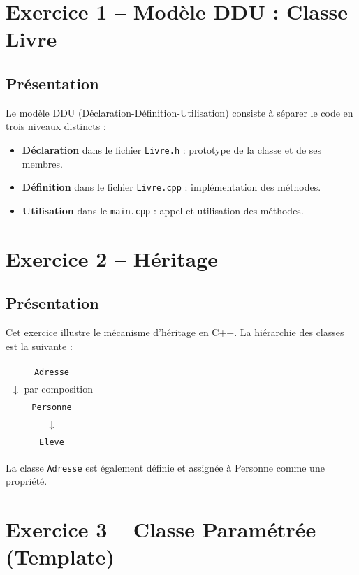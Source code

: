 \documentclass[12pt,a4paper]{article}
\begin{document}
\section{Exercice 1 -- Mod\`ele DDU : Classe Livre}

\subsection{Pr\'esentation}

Le mod\`ele DDU (D\'eclaration-D\'efinition-Utilisation) consiste \`a s\'eparer
le code en trois niveaux distincts :
\begin{itemize}[leftmargin=1.5cm]
    \item \textbf{D\'eclaration} dans le fichier \texttt{Livre.h} : prototype de la classe et de ses membres.
    \item \textbf{D\'efinition} dans le fichier \texttt{Livre.cpp} : impl\'ementation des m\'ethodes.
    \item \textbf{Utilisation} dans le \texttt{main.cpp} : appel et utilisation des m\'ethodes.
\end{itemize}


\section{Exercice 2 -- H\'eritage}

\subsection{Pr\'esentation}

Cet exercice illustre le m\'ecanisme d'h\'eritage en C++.
La hi\'erarchie des classes est la suivante :

\begin{center}
\begin{tabular}{c}
	\texttt{Adresse} \\
	 $\downarrow$  par composition\\
    \texttt{Personne} \\
    $\downarrow$ \\
    \texttt{Eleve}
\end{tabular}
\end{center}

La classe \texttt{Adresse} est \'egalement d\'efinie et assignée à Personne comme une propriété.


\section{Exercice 3 -- Classe Param\'etr\'ee (Template)}
\end{document}
